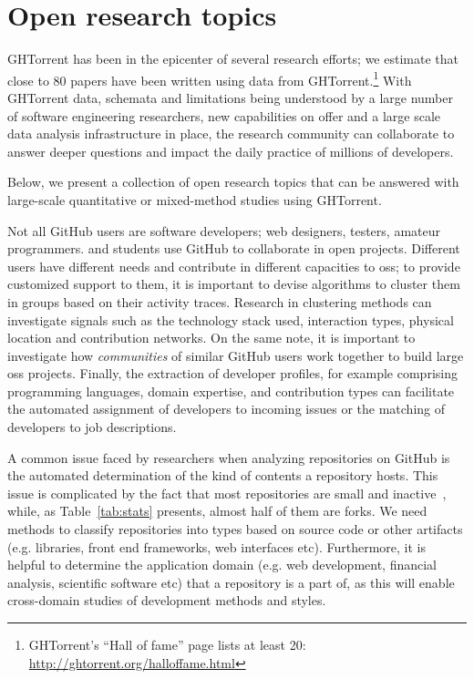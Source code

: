 \documentclass{sig-alternate}
\begin{document}
\section{Open research topics}

GHTorrent has been in the epicenter of several research
efforts; we estimate that close to 80 papers have been written using data from
GHTorrent.\footnote{GHTorrent's ``Hall of fame'' page lists at least 20:\\
\url{http://ghtorrent.org/halloffame.html}} With GHTorrent data, schemata and
limitations being understood by a large number of software engineering
researchers, new capabilities on offer and a large scale data analysis
infrastructure in place, the research community can collaborate to answer deeper
questions and impact the daily practice of millions of developers.

Below, we present a collection of open research topics that can be answered
with large-scale quantitative or mixed-method studies using GHTorrent.

 Not all GitHub users are software developers;
web designers, testers, amateur programmers. and students use GitHub to
collaborate in open projects. Different users have different needs and
contribute in different capacities to {\sc oss}; to provide customized support
to them, it is important to devise algorithms to cluster them in groups based on
their activity traces. Research in clustering methods can investigate signals
such as the technology stack used, interaction types, physical location and
contribution networks. On the same note, it is important to investigate how
\emph{communities} of similar GitHub users work together to build large {\sc
oss} projects. Finally, the extraction of developer profiles, for example
comprising programming languages, domain expertise, and contribution types can
facilitate the automated assignment of developers to incoming issues or the
matching of developers to job descriptions.

 A common issue faced by researchers when analyzing
repositories on GitHub is the automated determination of the kind of contents a
repository hosts. This issue is complicated by the fact that most repositories
are small and inactive~\cite{KGBSGD15}, while, as Table~\ref{tab:stats}
presents, almost half of them are forks. We need methods to classify
repositories into types based on source code or other artifacts (e.g. libraries,
front end frameworks, web interfaces etc).  Furthermore, it is helpful to
determine the application domain (e.g. web development, financial analysis,
scientific software etc) that a repository is a part of, as this will enable
cross-domain studies of development methods and styles.
\end{document}
